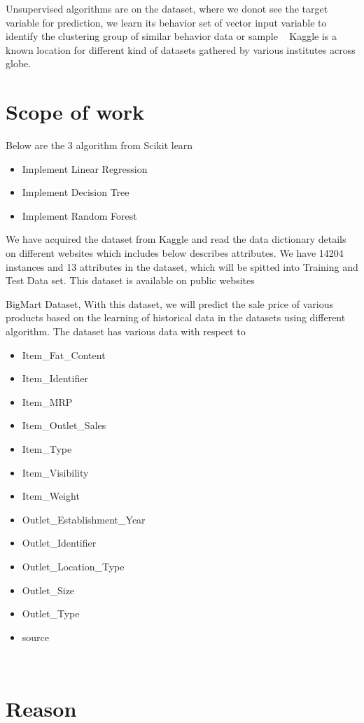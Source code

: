 Unsupervised algorithms are on the dataset, where we donot see the target variable 
for prediction, we learn its behavior set of vector input variable to identify the 
clustering group of similar behavior data or sample
~\cite{sckitml}
Kaggle is a known location for different kind of datasets gathered by various 
institutes across globe.

\section{Scope of work}

Below are the 3 algorithm from Scikit learn
\begin{itemize}
\item Implement Linear Regression
\item Implement Decision Tree
\item Implement Random Forest
\end{itemize}

We have acquired the dataset from Kaggle and read the data dictionary details on 
different websites which includes below describes attributes. We have 14204 instances and 13 
attributes in the dataset, which will be spitted into Training and Test Data set. This dataset 
is available on public websites

BigMart Dataset, With this dataset, we will predict the sale price of various products based 
on the learning of historical data in the datasets using different algorithm. The dataset has 
various data with respect to
\begin{itemize}
\item Item_Fat_Content
\item Item_Identifier
\item Item_MRP
\item Item_Outlet_Sales
\item Item_Type
\item Item_Visibility
\item Item_Weight
\item Outlet_Establishment_Year
\item Outlet_Identifier
\item Outlet_Location_Type
\item Outlet_Size
\item Outlet_Type
\item source
\end{itemize}
~\cite{kaggleds}

\section{Reason}

